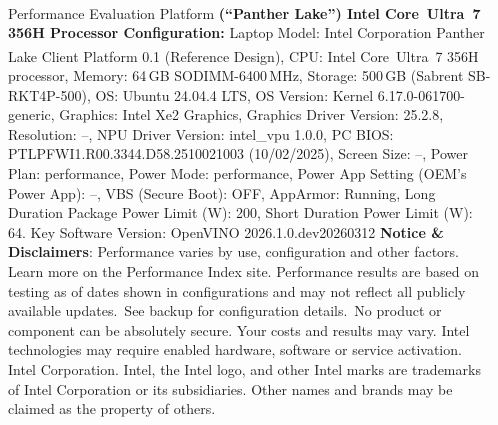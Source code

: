 \documentclass[final]{beamer}
\newlength{\sepwidth}
\newlength{\colwidth}
\newcommand{\separatorcolumn}{\begin{column}{\sepwidth}\end{column}}
\begin{document}
\begin{frame}[t]
\begin{columns}[t]
\begin{column}{\colwidth}
      \begin{block}{\footnotesize Performance Evaluation Platform}
        \scriptsize
        \textbf{(``Panther Lake'') Intel\textsuperscript{\textregistered} Core\texttrademark\ Ultra~7 356H Processor Configuration:}
        Laptop Model: Intel Corporation Panther Lake Client Platform 0.1 (Reference Design),
        CPU: Intel\textsuperscript{\textregistered} Core\texttrademark\ Ultra~7 356H processor,
        Memory: 64\,GB SODIMM-6400\,MHz,
        Storage: 500\,GB (Sabrent SB-RKT4P-500),
        OS: Ubuntu 24.04.4 LTS,
        OS Version: Kernel 6.17.0-061700-generic,
        Graphics: Intel Xe2 Graphics,
        Graphics Driver Version: 25.2.8,
        Resolution: --,
        NPU Driver Version: intel\_vpu 1.0.0,
        PC BIOS: PTLPFWI1.R00.3344.D58.2510021003 (10/02/2025),
        Screen Size: --,
        Power Plan: performance,
        Power Mode: performance,
        Power App Setting (OEM's Power App): --,
        VBS (Secure Boot): OFF,
        AppArmor: Running,
        Long Duration Package Power Limit (W): 200,
        Short Duration Power Limit (W): 64.
        Key Software Version: OpenVINO 2026.1.0.dev20260312
        \textbf{Notice \& Disclaimers}: Performance varies by use, configuration and other factors. Learn more on the Performance Index site. Performance results are based on testing as of dates shown in configurations and may not reflect all publicly available updates.  See backup for configuration details.  No product or component can be absolutely secure. Your costs and results may vary. Intel technologies may require enabled hardware, software or service activation.
        Intel Corporation. Intel, the Intel logo, and other Intel marks are trademarks of Intel Corporation or its subsidiaries. Other names and brands may be claimed as the property of others.
      \end{block}

    \end{column}

    \separatorcolumn
  \end{columns}

\end{frame}
\end{document}
